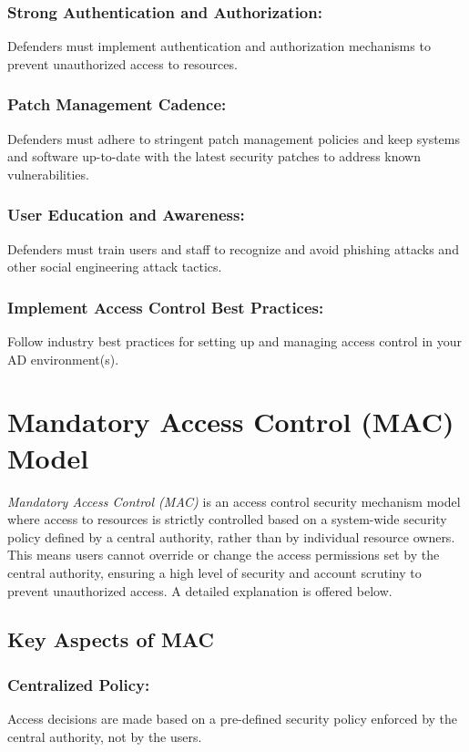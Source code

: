 \subsubsection{\textbf{Strong Authentication and Authorization:}}
Defenders must implement authentication and authorization mechanisms to prevent unauthorized access to resources.

\subsubsection{\textbf{Patch Management Cadence:}}
Defenders must adhere to stringent patch management policies and keep systems and software up-to-date with the latest security patches to address known vulnerabilities.

\subsubsection{\textbf{User Education and Awareness:}}
Defenders must train users and staff to recognize and avoid phishing attacks and other social engineering attack tactics.

\subsubsection{\textbf{Implement Access Control Best Practices:}}
Follow industry best practices for setting up and managing access control in your AD environment(s).

\section{Mandatory Access Control (MAC) Model}
\textit{Mandatory Access Control (MAC)} is an access control security mechanism model where access to resources is strictly controlled based on a system-wide security policy defined by a central authority, rather than by individual resource owners. This means users cannot override or change the access permissions set by the central authority, ensuring a high level of security and account scrutiny to prevent unauthorized access. A detailed explanation is offered below.

\subsection{Key Aspects of MAC}
\subsubsection{\textbf{Centralized Policy:}}
Access decisions are made based on a pre-defined security policy enforced by the central authority, not by the users.

